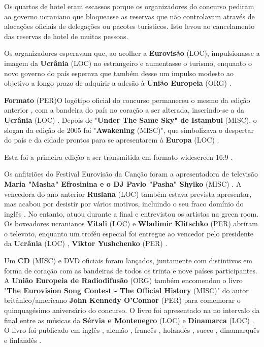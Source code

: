 \documentclass[12pt,a4paper]{article}
\begin{document}
Os quartos de hotel eram escassos porque os organizadores do concurso pediram ao governo ucraniano que bloqueasse as reservas que não controlavam através de alocações oficiais de delegações ou pacotes turísticos. Isto levou ao cancelamento das reservas de hotel de muitas pessoas.

Os organizadores esperavam que, ao acolher a \textbf{Eurovisão} (LOC), impulsionasse a imagem da \textbf{Ucrânia} (LOC) no estrangeiro e aumentasse o turismo, enquanto o novo governo do país esperava que também desse um impulso modesto ao objetivo a longo prazo de adquirir a adesão à \textbf{União Europeia} (ORG) .



\textbf{Formato} (PER)O logótipo oficial do concurso permaneceu o mesmo da edição anterior , com a bandeira do país no coração a ser alterada, inserindo-se a da \textbf{Ucrânia} (LOC) . Depois de "\textbf{Under The Same Sky" de Istambul} (MISC), o slogan da edição de 2005 foi "\textbf{Awakening} (MISC)", que simbolizava o despertar do país e da cidade prontos para se apresentarem à \textbf{Europa} (LOC) .

Esta foi a primeira edição a ser transmitida em formato widescreen 16:9 .

Os anfitriões do Festival Eurovisão da Canção foram a apresentadora de televisão \textbf{Maria "Masha" Efrosinina e o DJ Pavlo "Pasha" Shylko} (MISC) . A vencedora do ano anterior \textbf{Ruslana} (LOC) também estava prevista apresentar, mas acabou por desistir por vários motivos, incluindo o seu fraco domínio do inglês . No entanto, atuou durante a final e entrevistou os artistas na green room. Os boxeadores ucranianos \textbf{Vitali} (LOC) e \textbf{Wladimir Klitschko} (PER) abriram o televoto, enquanto um troféu especial foi entregue ao vencedor pelo presidente da \textbf{Ucrânia} (LOC) , \textbf{Viktor Yushchenko} (PER) .

Um \textbf{CD} (MISC) e DVD oficiais foram lançados, juntamente com distintivos em forma de coração com as bandeiras de todos os trinta e nove países participantes. A \textbf{União Europeia de Radiodifusão} (ORG) também encomendou o livro "\textbf{The Eurovision Song Contest - The Official History} (MISC)" do autor britânico/americano \textbf{John Kennedy O'Connor} (PER) para comemorar o quinquagésimo aniversário do concurso. O livro foi apresentado na no intervalo da final entre as músicas da \textbf{Sérvia e Montenegro} (LOC) e \textbf{Dinamarca} (LOC) . O livro foi publicado em inglês , alemão , francês , holandês , sueco , dinamarquês e finlandês .
\end{document}
